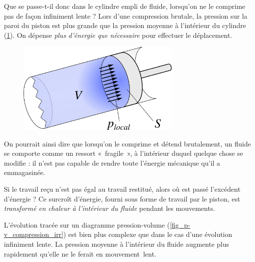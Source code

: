 		Que se passe-t-il donc dans le cylindre empli de fluide, lorsqu’on ne le comprime pas de façon infiniment lente ? Lors d’une compression brutale, la pression sur la paroi du piston est plus grande que la pression moyenne à l’intérieur du cylindre (\cref{fig_piston_fluide_rapide}). On dépense \emph{plus d’énergie que nécessaire} pour effectuer le déplacement.

		\begin{figure}
			\begin{center}
				\includegraphics[width=8cm]{images/travail_cylindre_3.png}
			\end{center}
			\label{fig_piston_fluide_rapide}
		\end{figure}

		On pourrait ainsi dire que lorsqu’on le comprime et détend brutalement, un fluide se comporte comme un ressort «~fragile~», à l’intérieur duquel quelque chose se modifie : il n’est pas capable de rendre toute l’énergie mécanique qu’il a emmagasinée.

		Si le travail reçu n’est pas égal au travail restitué, alors où est passé l’excédent d’énergie ? Ce surcroît d’énergie, fourni sous forme de travail par le piston, est \emph{transformé en chaleur à l’intérieur du fluide} pendant les mouvements.

		\onlyamphibook{\clearfloats}%
		L’évolution tracée sur un diagramme pression-volume (\cref{fig_p-v_compression_irr}) est bien plus complexe que dans le cas d’une évolution infiniment lente. La pression moyenne à l’intérieur du fluide augmente plus rapidement qu’elle ne le ferait en mouvement~lent.

